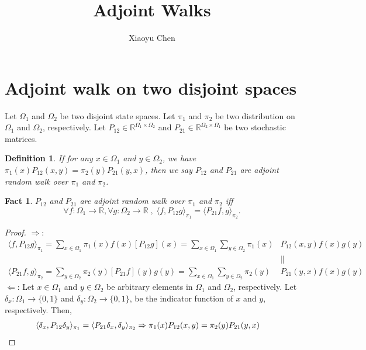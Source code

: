 \documentclass{article}
\title{Adjoint Walks}
\author{Xiaoyu Chen}
\date{}
\newtheorem{define}{Definition}
\newtheorem{fact}{Fact}
\def\<{\langle}
\def\>{\rangle}
\begin{document}
\maketitle

\section{Adjoint walk on two disjoint spaces}

Let $\Omega_1$ and $\Omega_2$ be two disjoint state spaces.
Let $\pi_1$ and $\pi_2$ be two distribution on $\Omega_1$ and $\Omega_2$, respectively.
Let $P_{12} \in \mathbb{R}^{\Omega_1 \times \Omega_2}$ and $P_{21} \in \mathbb{R}^{\Omega_2 \times \Omega_1}$ be two stochastic matrices.

\begin{define}
  If for any $x\in \Omega_1$ and $y \in \Omega_2$, we have $\pi_1(x)P_{12}(x, y) = \pi_2(y)P_{21}(y, x)$, then we say $P_{12}$ and $P_{21}$ are \emph{adjoint random walk} over $\pi_1$ and $\pi_2$.
\end{define}

\begin{fact}
  $P_{12}$ and $P_{21}$ are \emph{adjoint random walk} over $\pi_1$ and $\pi_2$ iff
  \[ \forall f: \Omega_1 \to \mathbb{R}, \forall g: \Omega_2 \to \mathbb{R} \;,\; \<f, P_{12}g\>_{\pi_1} = \< P_{21}f, g \>_{\pi_2}.  \]
\end{fact}
\begin{proof}
  $\Rightarrow$:
  \begin{align*}
    \< f, P_{12} g\>_{\pi_1}
    = \sum_{x\in\Omega_1} \pi_1(x) f(x) \left[P_{12}g\right](x)
    = \sum_{x\in\Omega_1}\sum_{y\in\Omega_2} \pi_1(x)&P_{12}(x, y) f(x) g(y) \\
    &\|\\
    \< P_{21}f, g \>_{\pi_2}
    = \sum_{y\in\Omega_2} \pi_2(y) \left[P_{21}f\right](y) g(y)
    = \sum_{x\in\Omega_1}\sum_{y\in\Omega_2} \pi_2(y)&P_{21}(y, x) f(x) g(y)
  \end{align*}
  $\Leftarrow$: Let $x \in \Omega_1$ and $y \in \Omega_2$ be arbitrary elements in $\Omega_1$ and $\Omega_2$, respectively.
  Let $\delta_x : \Omega_1 \to \{0, 1\}$ and $\delta_y : \Omega_2 \to \{0, 1\}$, be the indicator function of $x$ and $y$, respectively.
  Then,
  \begin{align*}
    \<\delta_x, P_{12}\delta_y\>_{\pi_1} &= \<P_{21}\delta_x, \delta_y\>_{\pi_2} \Rightarrow \pi_1(x)P_{12}(x, y) = \pi_2(y)P_{21}(y, x) \qedhere
  \end{align*}
\end{proof}
\end{document}
